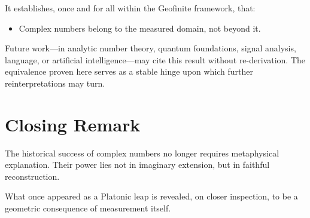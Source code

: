 \documentclass[12pt]{book}  %
\begin{document}
It establishes, once and for all within the Geofinite framework, that:

\begin{itemize}
    \item Complex numbers belong to the measured domain, not beyond it.
\end{itemize}

Future work—in analytic number theory, quantum foundations, signal analysis, language, or artificial intelligence—may cite this result without re-derivation. The equivalence proven here serves as a stable hinge upon which further reinterpretations may turn.

\section*{Closing Remark}

The historical success of complex numbers no longer requires metaphysical explanation. Their power lies not in imaginary extension, but in faithful reconstruction.

What once appeared as a Platonic leap is revealed, on closer inspection, to be a geometric consequence of measurement itself.
\end{document}

